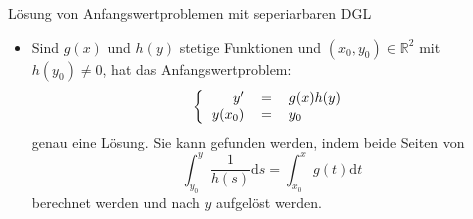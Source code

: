 \begin{KR}{Lösung von Anfangswertproblemen mit seperiarbaren DGL}
  \begin{itemize}
    \item Sind \(g(x)\) und \(h(y)\) stetige Funktionen und \((x_0,y_0)\in \mathbb{R}^2\) mit \(h(y_0)\neq 0\), hat das
      Anfangswertproblem:
      \[\left\{\begin{tabular}{rcl}
	  \(y'\)&\(=\)&\(g(x)h(y)\)\\
	  \(y(x_0)\)&\(=\)&\(y_0\)\\
      \end{tabular}\right.\]
      genau eine Lösung. Sie kann gefunden werden, indem beide Seiten von 
      \[\int_{y_0}^{y}{\frac{1}{h(s)}\mathrm{d}s}=\int_{x_0}^{x}{g(t)\mathrm{d}t}\]
      berechnet werden und nach \(y\) aufgelöst werden.
  \end{itemize}
\end{KR}

